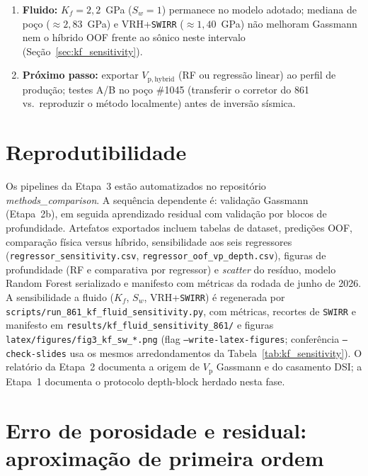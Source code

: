 \documentclass[11pt,a4paper]{article}
\numberwithin{equation}{section}
\newcommand{\Vp}{\ensuremath{V_{\mathrm{p}}}}
\begin{document}
\begin{enumerate}
        observado ($\Delta V_{\mathrm{p}}<0$); outros mecanismos
        ($r_{\mathrm{outros}}$) precisam dominar o sinal em média.
  \item \textbf{Fluido:} $K_f=2{,}2$~GPa ($S_w=1$) permanece no modelo adotado;
        mediana de poço ($\approx 2{,}83$~GPa) e VRH+\texttt{SWIRR}
        ($\approx 1{,}40$~GPa) não melhoram Gassmann nem o híbrido
        OOF frente ao sônico neste intervalo
        (Seção~\ref{sec:kf_sensitivity}).
  \item \textbf{Próximo passo:} exportar $V_{\mathrm{p,hybrid}}$ (RF ou
        regressão linear) ao perfil de produção; testes A/B no poço \#1045
        (transferir o corretor do 861 vs.\ reproduzir o método localmente)
        antes de inversão sísmica.
\end{enumerate}

\section*{Reprodutibilidade}

Os pipelines da Etapa~3 estão automatizados no repositório
\emph{methods\_comparison}.
A sequência dependente é: validação Gassmann (Etapa~2b), em seguida
aprendizado residual com validação por blocos de profundidade.
Artefatos exportados incluem tabelas de dataset, predições OOF, comparação
física versus híbrido, sensibilidade aos seis regressores
(\texttt{regressor\_sensitivity.csv},
\texttt{regressor\_oof\_vp\_depth.csv}), figuras de profundidade (RF e comparativa
por regressor) e \emph{scatter} do resíduo, modelo Random Forest serializado e manifesto com métricas da
rodada de junho de 2026.
A sensibilidade a fluido ($K_f$, $S_w$, VRH+\texttt{SWIRR}) é regenerada por
\texttt{scripts/run\_861\_kf\_fluid\_sensitivity.py}, com métricas, recortes de
\texttt{SWIRR} e manifesto em
\texttt{results/kf\_fluid\_sensitivity\_861/} e figuras
\texttt{latex/figures/fig3\_kf\_sw\_*.png}
(flag \texttt{--write-latex-figures}; conferência \texttt{--check-slides}
usa os mesmos arredondamentos da Tabela~\ref{tab:kf_sensitivity}).
O relatório da Etapa~2 documenta a origem de \Vp{} Gassmann e do casamento DSI;
a Etapa~1 documenta o protocolo depth-block herdado nesta fase.

\appendix

\section{Erro de porosidade e residual: aproximação de primeira ordem}
\label{app:phi_taylor}
\end{document}
